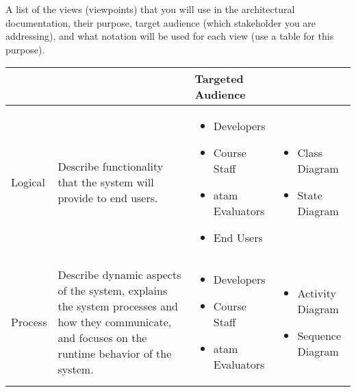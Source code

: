 A list of the views (viewpoints) that you will use in the architectural
documentation, their purpose, target audience (which stakeholder you are
addressing), and what notation will be used for each view (use a table for this purpose).

\bgroup
	\def\arraystretch{2}
	\begin{table}[ht]
		\centering
		\small
		\begin{tabularx}{\textwidth}{p{2cm}Xp{4cm}p{4cm}}
			\toprule
				\thead{View} & \thead{Purpose} & \thead{Targeted \\Audience} & \thead{Notation} \\
			\midrule
				Logical & Describe functionality that the system will provide to end users. &
				\begin{minipage}[t]{\textwidth}
				  \begin{itemize}[noitemsep, leftmargin=15pt]
				    \item Developers
						\item Course Staff
						\item \gls{atam} Evaluators
						\item End Users
				  \end{itemize}
				\end{minipage}
				&
				\begin{minipage}[t]{\textwidth}
					\begin{itemize}[noitemsep, leftmargin=10pt]
						\item Class Diagram
						\item State Diagram
					\end{itemize}
				\end{minipage} \\

				Process & Describe dynamic aspects of the system, explains the system processes and how they communicate, and focuses on the runtime behavior of the system. &
				\begin{minipage}[t]{\textwidth}
					\begin{itemize}[noitemsep, leftmargin=15pt]
						\item Developers
						\item Course Staff
						\item \gls{atam} Evaluators
					\end{itemize}
				\end{minipage}
				&
				\begin{minipage}[t]{\textwidth}
					\begin{itemize}[noitemsep, leftmargin=10pt]
						\item Activity Diagram
						\item Sequence Diagram
					\end{itemize}
				\end{minipage} \\


\end{tabularx}
\end{table}
